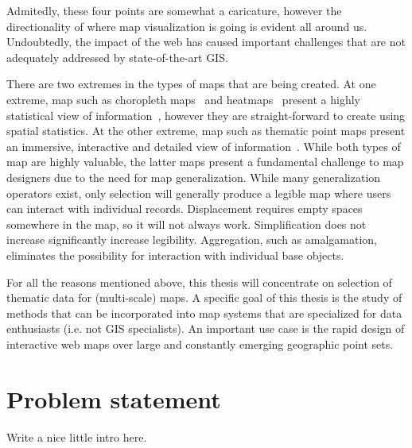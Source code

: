 \documentclass[11pt, oneside]{report}
\begin{document}
Admitedly, these four points are somewhat a caricature, however the directionality of where map visualization is going is evident all around us. Undoubtedly, the impact of the web has caused important challenges that are not adequately addressed by state-of-the-art GIS. 

There are two extremes in the types of maps that are being created. At one extreme, map such as choropleth maps~\cite{jenks1963generalization} and heatmaps~\cite{wiki2014heatmap} present a highly statistical view of information~\cite{guardian2013ananas}, however they are straight-forward to create using spatial statistics. At the other extreme, map such as thematic point maps present an immersive, interactive and detailed view of information~\cite{nytimes2010iraq}. While both types of map are highly valuable, the latter maps present a fundamental challenge to map designers due to the need for map generalization. While many generalization operators exist, only selection will generally produce a legible map where users can interact with individual records. Displacement requires empty spaces somewhere in the map, so it will not always work. Simplification does not increase significantly increase legibility. Aggregation, such as amalgamation, eliminates the possibility for interaction with individual base objects.

For all the reasons mentioned above, this thesis will concentrate on selection of thematic data for (multi-scale) maps. A specific goal of this thesis is the study of methods that can be incorporated into map systems that are specialized for data enthusiasts (i.e. not GIS specialists). An important use case is the rapid design of interactive web maps over large and constantly emerging geographic point sets.

\section{Problem statement}
\label{introduction:problem:statement}

Write a nice little intro here.
\end{document}
